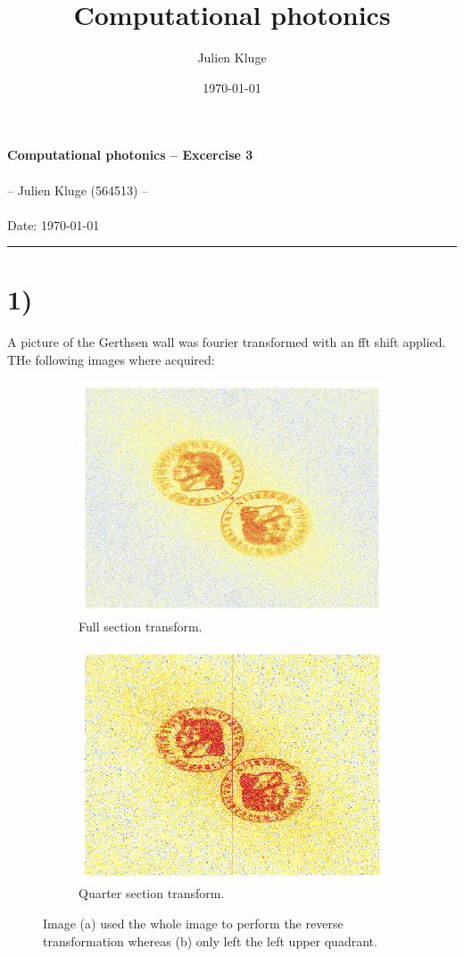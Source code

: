 \documentclass[12pt,a4paper]{article}
\title{Computational photonics}
\author{Julien Kluge}
\date{\today}
\begin{document}
\lstset{numbers=left}

\begin{center}
\large{\textbf{Computational photonics -- Excercise 3}} \\
~\\
\small{-- Julien Kluge (564513) --}\\
~\\
Date: \today
\end{center}
\hrule
	\section*{1)}
	A picture of the Gerthsen wall was fourier transformed with an
	fft shift applied. THe following images where acquired: 
	\begin{figure}[H]
		\begin{subfigure}[b]{0.48\textwidth}
			\centering
			\includegraphics[width=\textwidth]{Fourier.png}
			\caption{Full section transform.}
		\end{subfigure}
		\begin{subfigure}[b]{0.48\textwidth}
			\centering
			\includegraphics[width=\textwidth]{Fourier_Cropped.png}
			\caption{Quarter section transform.}
		\end{subfigure}
		\caption{Image (a) used the whole image to perform the
		reverse transformation whereas (b) only left the left
		upper quadrant.}
	\end{figure}
\end{document}
